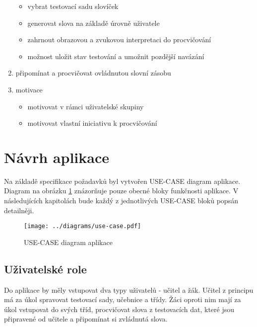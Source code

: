 \documentclass[a4paper,11pt,titlepage,fleqn]{article}
\begin{document}
\begin{enumerate}
                \begin{itemize}
                    \item vybrat testovací sadu slovíček
                    \item generovat slova na základě úrovně uživatele
                    \item zahrnout obrazovou a zvukovou interpretaci do procvičování
                    \item možnost uložit stav testování a umožnit pozdější navázání
                \end{itemize}
            \item připomínat a procvičovat ovládnutou slovní zásobu 
            \item motivace
                \begin{itemize}
                    \item motivovat v rámci uživatelské skupiny
                    \item motivovat vlastní iniciativu k procvičování
                \end{itemize}
        \end{enumerate}


\newpage
\section{Návrh aplikace}
    Na základě specifikace požadavků byl vytvořen USE-CASE diagram aplikace. Diagram na obrázku \ref{fig:use-case} znázorňuje pouze obecné bloky funkčnosti aplikace. V následujících kapitolách bude každý z jednotlivých USE-CASE bloků popsán detailněji.

        \begin{figure}[ht!]
            \centering
            \texttt{[image: ../diagrams/use-case.pdf]}
            \caption{USE-CASE diagram aplikace}
            \label{fig:use-case}
        \end{figure}

    \subsection{Uživatelské role}
        Do aplikace by měly vstupovat dva typy uživatelů - učitel a žák. Učitel z principu má za úkol spravovat testovací sady, učebnice a třídy. Žáci oproti nim mají za úkol vstupovat do svých tříd, procvičovat slova z testovacích dat, které jsou připravené od učitele a připomínat si zvládnutá slova. 
\end{document}
